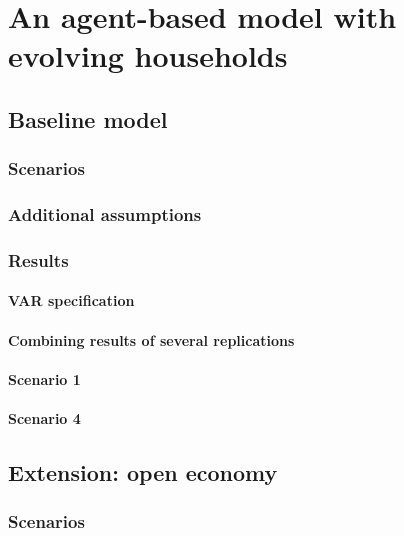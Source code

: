 \chapter{An agent-based model with evolving households}
    \lipsum[1]
    \section{Baseline model}
        \lipsum[1]
        \subsection{Scenarios}
            \lipsum[1]
        \subsection{Additional assumptions}
            \lipsum[1]
        \subsection{Results}
            \lipsum[1]
            \subsubsection{VAR specification}
                \lipsum[1]
            \subsubsection{Combining results of several replications}
                \lipsum[1]
            \subsubsection{Scenario 1}
                \lipsum[1]
                    \lipsum[1]
            \subsubsection{Scenario 4}
                \lipsum[1]
                    \lipsum[1]
    \section{Extension: open economy}
        \lipsum[1]
        \subsection{Scenarios}
            \lipsum[1]
